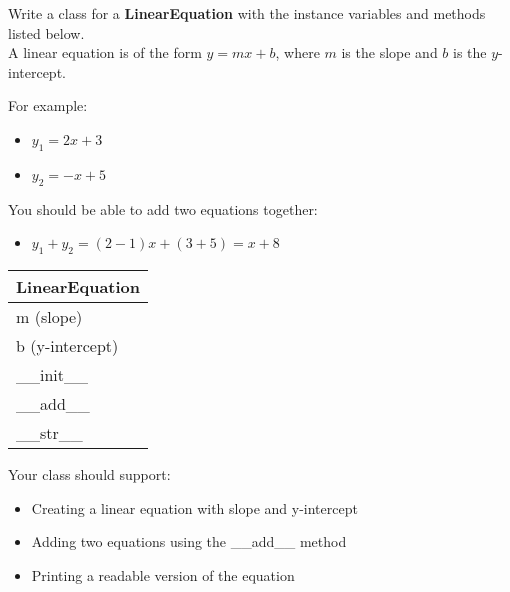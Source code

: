 




	\item
		Write a class for a \textbf{LinearEquation} with the instance variables and methods listed 
		below.\\ A linear equation is of the form $y = mx + b$, where $m$ is the slope and $b$ is 
		the $y$-intercept.

		\begin{minipage}[t]{0.65\textwidth}
				For example:
			\begin{itemize}
				\item $y_1 = 2x + 3$
				\item $y_2 = -x + 5$
			\end{itemize}
			You should be able to add two equations together:
			\begin{itemize}
				\item $y_1 + y_2 = (2 - 1)x + (3 + 5) = x + 8$
			\end{itemize}
		\end{minipage}
		\hfill
		\begin{minipage}[t]{0.32\textwidth}
			\vspace{0.2em}
			\begin{flushright}
				\begin{tabular}{|l|}
					\hline
					LinearEquation \\ \hline
					m (slope) \\
					b (y-intercept) \\ \hline
					\_\_init\_\_ \\
					\_\_add\_\_ \\
					\_\_str\_\_ \\ \hline
				\end{tabular}
			\end{flushright}
		\end{minipage}
		
		Your class should support:
		\begin{itemize}
			\item Creating a linear equation with slope and y-intercept
			\item Adding two equations using the \_\_add\_\_ method
			\item Printing a readable version of the equation
		\end{itemize}
		
